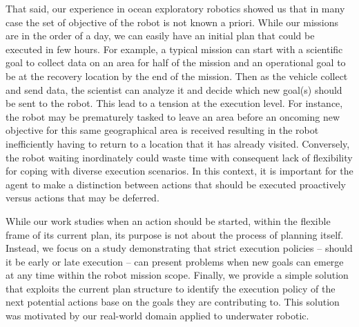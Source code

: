 That said, our experience in ocean exploratory robotics showed
us that in many case the set of objective of the robot is not known a
priori. While our missions are in the order of a day, we can easily
have an initial plan that could be executed in few hours. For example, 
a typical mission can start with a scientific goal to collect data on
an area for half of the mission and an operational goal to be at the
recovery location by the end of the mission. Then as the vehicle
collect and send data, the scientist can analyze it and decide which
new goal(s) should be sent to the robot. This lead to a tension at the
execution level.
 For instance, the robot may be prematurely tasked to leave an
area before an oncoming new objective for this same geographical area
is received resulting in the robot inefficiently having to return to a
location that it has already visited. Conversely, the robot waiting
inordinately could waste time with consequent lack of flexibility for
coping with diverse execution scenarios. In this context, it is
important for the agent to make a distinction between actions that should
be executed proactively versus actions that may be deferred. 


While our work studies when an action should be started, within the
flexible frame of its current plan, its purpose is not about the
process of planning itself. Instead, we focus on a study demonstrating
that strict execution policies -- should it be early or late execution
-- can present problems when new goals can emerge at any time within
the robot mission scope. Finally, we provide a simple solution that
exploits the current plan structure to identify the execution policy
of the next potential actions base on the goals they are contributing
to. This solution was motivated by our real-world domain applied to
underwater robotic.




